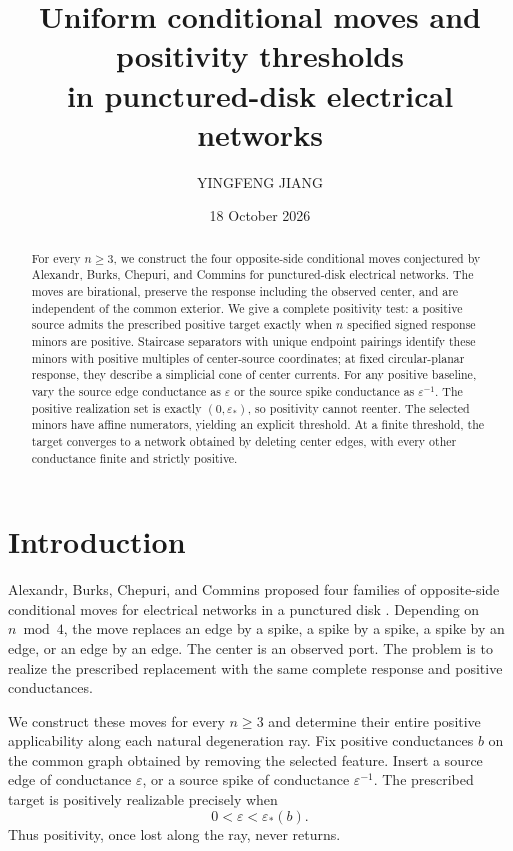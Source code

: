 \documentclass[11pt]{article}
\title{Uniform conditional moves and positivity thresholds\texorpdfstring{\\}{ }in punctured-disk electrical networks}
\author{YINGFENG JIANG}
\date{18 October 2026}
\theoremstyle{definition}
\begin{document}
\maketitle

\begin{abstract}
For every $n\ge3$, we construct the four opposite-side conditional
moves conjectured by Alexandr, Burks, Chepuri, and Commins for
punctured-disk electrical networks. The moves are birational,
preserve the response including the observed center, and are
independent of the common exterior. We give a complete positivity
test: a positive source admits the prescribed positive target exactly
when $n$ specified signed response minors are positive. Staircase
separators with unique endpoint pairings identify these minors with
positive multiples of center-source coordinates; at fixed
circular-planar response, they describe a simplicial cone of center
currents. For any positive baseline, vary the source edge conductance
as $\varepsilon$ or the source spike conductance as
$\varepsilon^{-1}$. The positive realization set is exactly
$(0,\varepsilon_*)$, so positivity cannot reenter. The selected
minors have affine numerators, yielding an explicit threshold.
At a finite threshold, the target converges to a network obtained
by deleting center edges, with every other conductance finite
and strictly positive.
\end{abstract}

\section{Introduction}
\label{sec:introduction}

Alexandr, Burks, Chepuri, and Commins proposed four families of
opposite-side conditional moves for electrical networks in a punctured
disk \cite[Section 5.2, Conjecture 4]{ABCC}. Depending on $n\bmod4$,
the move replaces an edge by a spike, a spike by a spike, a spike by
an edge, or an edge by an edge. The center is an observed port.
The problem is to realize the prescribed replacement with the same
complete response and positive conductances.

We construct these moves for every $n\ge3$ and determine their
entire positive applicability along each natural degeneration ray.
Fix positive conductances $b$ on the common graph obtained by
removing the selected feature. Insert a source edge of conductance
$\varepsilon$, or a source spike of conductance $\varepsilon^{-1}$.
The prescribed target is positively realizable precisely when
\[
 0<\varepsilon<\varepsilon_*(b).
\]
Thus positivity, once lost along the ray, never returns.
\end{document}
